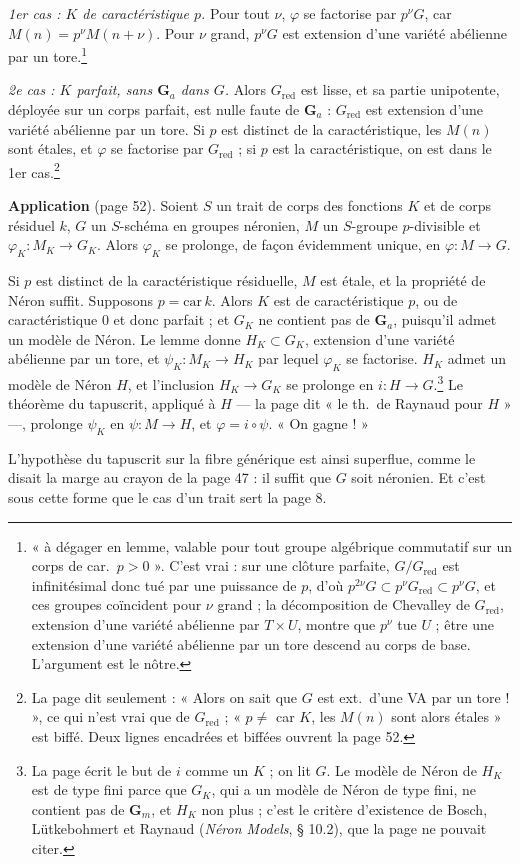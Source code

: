 \documentclass[11pt,a4paper]{article}
\begin{document}
\emph{1er cas : $K$ de caractéristique $p$.} Pour tout $\nu$, $\varphi$ se
factorise par $p^\nu G$, car $M(n) = p^\nu M(n + \nu)$. Pour $\nu$ grand,
$p^\nu G$ est extension d'une variété abélienne par un tore.\footnote{« à
dégager en lemme, valable pour tout groupe algébrique commutatif sur un corps
de car.\ $p > 0$ ». C'est vrai : sur une clôture parfaite, $G/G_{\mathrm{red}}$ est
infinitésimal donc tué par une puissance de $p$, d'où
$p^{2\nu} G \subset p^\nu G_{\mathrm{red}} \subset p^\nu G$, et ces groupes
coïncident pour $\nu$ grand ; la décomposition de Chevalley de
$G_{\mathrm{red}}$, extension d'une variété abélienne par $T \times U$,
montre que $p^\nu$ tue $U$ ; être une extension d'une variété
abélienne par un tore descend au corps de base. L'argument est le nôtre.}

\emph{2e cas : $K$ parfait, sans $\mathbf{G}_a$ dans $G$.} Alors
$G_{\mathrm{red}}$ est lisse, et sa partie unipotente, déployée sur un corps
parfait, est nulle faute de $\mathbf{G}_a$ : $G_{\mathrm{red}}$ est extension
d'une variété abélienne par un tore. Si $p$ est distinct de la
caractéristique, les $M(n)$ sont étales, et $\varphi$ se factorise par
$G_{\mathrm{red}}$ ; si $p$ est la caractéristique, on est dans le 1er
cas.\footnote{La page dit seulement : « Alors on sait que $G$ est ext.\ d'une
VA par un tore ! », ce qui n'est vrai que de $G_{\mathrm{red}}$ ; « $p \neq$ car
$K$, les $M(n)$ sont alors étales » est biffé. Deux lignes encadrées et
biffées ouvrent la page 52.}

\textbf{Application} (page 52). Soient $S$ un trait de corps des fonctions $K$
et de corps résiduel $k$, $G$ un $S$-schéma en groupes néronien, $M$ un
$S$-groupe $p$-divisible et $\varphi_K : M_K \to G_K$. Alors $\varphi_K$ se
prolonge, de façon évidemment unique, en $\varphi : M \to G$.

Si $p$ est distinct de la caractéristique résiduelle, $M$ est étale, et la
propriété de Néron suffit. Supposons $p = \mathrm{car}\,k$. Alors $K$ est de
caractéristique $p$, ou de caractéristique $0$ et donc parfait ; et $G_K$ ne
contient pas de $\mathbf{G}_a$, puisqu'il admet un modèle de Néron. Le lemme
donne $H_K \subset G_K$, extension d'une variété abélienne par un tore, et
$\psi_K : M_K \to H_K$ par lequel $\varphi_K$ se factorise. $H_K$ admet un
modèle de Néron $H$, et l'inclusion $H_K \to G_K$ se prolonge en $i : H \to
G$.\footnote{La page écrit le but de $i$ comme un $K$ ; on lit $G$. Le modèle
de Néron de $H_K$ est de type fini parce que $G_K$, qui a un modèle de Néron de
type fini, ne contient pas de $\mathbf{G}_m$, et $H_K$ non plus ; c'est le
critère d'existence de Bosch, Lütkebohmert et Raynaud (\emph{Néron Models},
§ 10.2), que la page ne pouvait citer.} Le théorème du tapuscrit, appliqué à
$H$ --- la page dit « le th.\ de Raynaud pour $H$ » ---, prolonge $\psi_K$ en
$\psi : M \to H$, et $\varphi = i \circ \psi$. « On gagne ! »

L'hypothèse du tapuscrit sur la fibre générique est ainsi superflue, comme le
disait la marge au crayon de la page 47 : il suffit que $G$ soit néronien. Et
c'est sous cette forme que le cas d'un trait sert la page 8.
\end{document}
